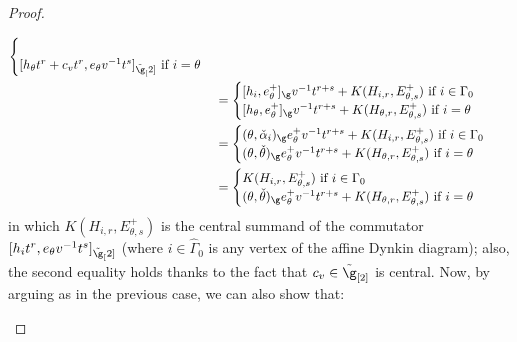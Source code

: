 \begin{proof}
\begin{itemize}
$$\begin{aligned}
\begin{cases}
                                    \\
                                    \text{$[h_{\theta} t^r + c_v t^r, e_{\theta} v^{-1} t^s]_{\tilde{\g}_[2]}$ if $i = \theta$}
                                \end{cases}
                                \\
                                & =
                                \begin{cases}
                                    \text{$[h_i, e_{\theta}^+]_{\g} v^{-1} t^{r + s} + K(H_{i, r}, E_{\theta, s}^+)$ if $i \in \Gamma_0$}
                                    \\
                                    \text{$[h_{\theta}, e_{\theta}^+]_{\g} v^{-1} t^{r + s} + K(H_{\theta, r}, E_{\theta, s}^+)$ if $i = \theta$}
                                \end{cases}
                                \\
                                & = 
                                \begin{cases}
                                    \text{$(\theta, \check{\alpha}_i)_{\g} e_{\theta}^+ v^{-1} t^{r + s} + K(H_{i, r}, E_{\theta, s}^+)$ if $i \in \Gamma_0$}
                                    \\
                                    \text{$(\theta, \check{\theta})_{\g} e_{\theta}^+ v^{-1} t^{r + s} + K(H_{\theta, r}, E_{\theta, s}^+)$ if $i = \theta$}
                                \end{cases}
                                \\
                                & = 
                                \begin{cases}
                                    \text{$K(H_{i, r}, E_{\theta, s}^+)$ if $i \in \Gamma_0$}
                                    \\
                                    \text{$(\theta, \check{\theta})_{\g} e_{\theta}^+ v^{-1} t^{r + s} + K(H_{\theta, r}, E_{\theta, s}^+)$ if $i = \theta$}
                                \end{cases}
                            \end{aligned}
                        $$
                    in which $K(H_{i, r}, E_{\theta, s}^+)$ is the central summand of the commutator $[h_i t^r, e_{\theta} v^{-1} t^s]_{\tilde{\g}_[2]}$ (where $i \in \hat{\Gamma}_0$ is any vertex of the affine Dynkin diagram); also, the second equality holds thanks to the fact that $c_v \in \tilde{\g}_{[2]}$ is central. Now, by arguing as in the previous case, we can also show that:

\end{itemize}
\end{proof}
